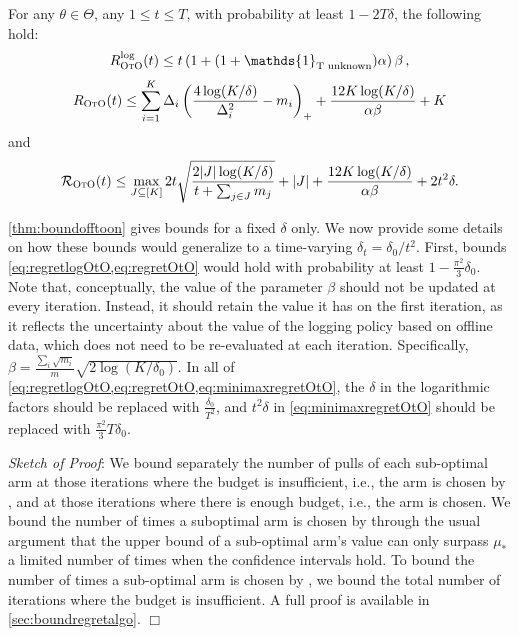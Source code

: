 \begin{theorem}\label{thm:boundofftoon}
    For any $\theta\in \Theta$, any $1\leq t\leq T$, with probability at least $1-2T\delta$, the following hold:
    \begin{align}\label{eq:regretlogOtO}
            R^{\text{log}}_{\algoname}(t)\leq t\left(1+(1+\mathds{1}_{\text{T unknown}})\alpha\right)\beta\,,
    \end{align}
\begin{align}\label{eq:regretOtO}
       R_{\textsc{OtO}}(t)\leq \sum_{i=1}^K\Delta_i\left(\frac{4\log(K/\delta)}{\Delta_i^2}-m_i\right)_++\frac{12 K\log(K/\delta)}{\alpha \beta}+K
\end{align} 
and
\begin{align}\label{eq:minimaxregretOtO}
    \mathcal{R}_\textsc{OtO}(t)\leq
   \max_{J\subseteq [K]}2t\sqrt{\frac{2|J|\log(K/\delta)}{t+\sum_{j\in J}m_j}}+|J|+\frac{12 K\log(K/\delta)}{\alpha \beta}+2t^2\delta.
\end{align}   
\end{theorem}
\begin{remark}
    \cref{thm:boundofftoon} gives bounds for a fixed \(\delta\) only. We now provide some details on how these bounds would generalize to a time-varying \(\delta_t = \delta_0 / t^2\). First, bounds \cref{eq:regretlogOtO,eq:regretOtO} would hold with probability at least \(1 - \frac{\pi^2}{3}\delta_0\). Note that, conceptually, the value of the parameter \(\beta\) should not be updated at every iteration. Instead, it should retain the value it has on the first iteration, as it reflects the uncertainty about the value of the logging policy based on offline data, which does not need to be re-evaluated at each iteration. Specifically, \(\beta = \frac{\sum_i \sqrt{m_i}}{m} \sqrt{2\log(K/\delta_0)}\). In all of \cref{eq:regretlogOtO,eq:regretOtO,eq:minimaxregretOtO}, the \(\delta\) in the logarithmic factors should be replaced with \(\frac{\delta_0}{T^2}\), and \(t^2\delta\) in \cref{eq:minimaxregretOtO} should be replaced with \(\frac{\pi^2}{3}T\delta_0\).
\end{remark}

\textit{Sketch of Proof}: We bound separately the number of pulls of each sub-optimal arm at those iterations where the budget is insufficient, i.e., the arm is chosen by \alglcb, and at those iterations where there is enough budget, i.e., the \algucb arm is chosen. We bound the number of times a suboptimal arm is chosen by \algucb through the usual argument that the upper bound of a sub-optimal arm's value can only surpass $\mu_*$ a limited number of times when the confidence intervals hold. To bound the number of times a sub-optimal arm is chosen by \alglcb, we bound the total number of iterations where the budget is insufficient. A full proof is available in \cref{sec:boundregretalgo}. \hfill \( \Box\)

